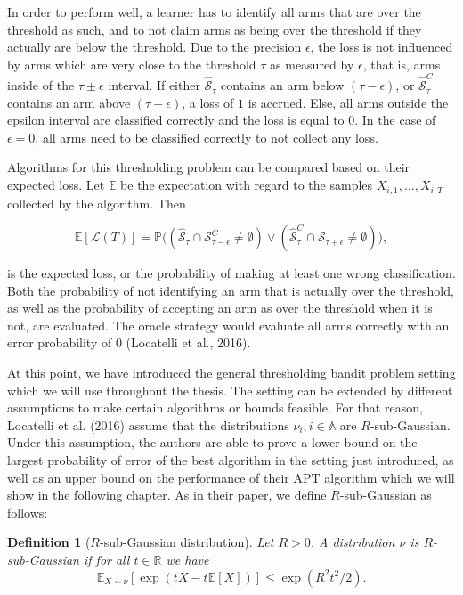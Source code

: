 \documentclass[11pt,]{article}
\newtheorem{definition}{Definition}
\begin{document}
In order to perform well, a learner has to identify all arms that are
over the threshold as such, and to not claim arms as being over the
threshold if they actually are below the threshold. Due to the precision
\(\epsilon\), the loss is not influenced by arms which are very close to
the threshold \(\tau\) as measured by \(\epsilon\), that is, arms inside
of the \(\tau \pm \epsilon\) interval. If either
\(\hat{\mathcal{S}}_{\tau}\) contains an arm below
\((\tau - \epsilon)\), or \(\hat{\mathcal{S}}^C_{\tau}\) contains an arm
above \((\tau + \epsilon)\), a loss of \(1\) is accrued. Else, all arms
outside the epsilon interval are classified correctly and the loss is
equal to \(0\). In the case of \(\epsilon = 0\), all arms need to be
classified correctly to not collect any loss.

Algorithms for this thresholding problem can be compared based on their
expected loss. Let \(\mathbb{E}\) be the expectation with regard to the
samples \(X_{i,1}, ..., X_{i,T}\) collected by the algorithm. Then

\[
\mathbb{E}[\mathcal{L}(T)] = \mathbb{P}\big((\hat{\mathcal{S}}_{\tau} \cap \mathcal{S}_{\tau-\epsilon}^C \neq \emptyset) \lor(\hat{\mathcal{S}}_{\tau}^C \cap \mathcal{S}_{\tau+\epsilon} \neq \emptyset)\big),
\]

is the expected loss, or the probability of making at least one wrong
classification. Both the probability of not identifying an arm that is
actually over the threshold, as well as the probability of accepting an
arm as over the threshold when it is not, are evaluated. The oracle
strategy would evaluate all arms correctly with an error probability of
\(0\) (Locatelli et al., 2016).

At this point, we have introduced the general thresholding bandit
problem setting which we will use throughout the thesis. The setting can
be extended by different assumptions to make certain algorithms or
bounds feasible. For that reason, Locatelli et al. (2016) assume that
the distributions \(\nu_i, i \in \mathbb{A}\) are \(R\)-sub-Gaussian.
Under this assumption, the authors are able to prove a lower bound on
the largest probability of error of the best algorithm in the setting
just introduced, as well as an upper bound on the performance of their
APT algorithm which we will show in the following chapter. As in their
paper, we define \(R\)-sub-Gaussian as follows:

\begin{definition}[$R$-sub-Gaussian distribution] 
\label{definition:rsubgaussian}
Let $R > 0$. A distribution $\nu$ is $R$-sub-Gaussian if for all $t \in \mathbb{R}$ we have
\begin{equation*}
\mathbb{E}_{X \sim \nu}[\exp(tX - t\mathbb{E}[X])] \leq \exp(R^2t^2/2).
\end{equation*}
\end{definition}
\end{document}
